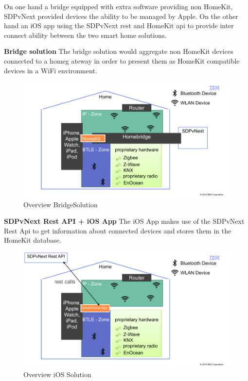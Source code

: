 			On one hand a bridge equipped with extra software providing non HomeKit, SDPvNext provided devices the ability to be managed by Apple. On the other hand an iOS app using the SDPvNext rest and HomeKit api to provide inter connect ability between the two smart home solutions.

			\pagebreak

			\textbf{Bridge solution}
				The bridge solution would aggregate non HomeKit devices connected to a homeg ateway in order to present them as HomeKit compatible devices in a WiFi environment.

				\begin{figure}[h]
					\centering
						\includegraphics[width=.9\textwidth]{images/praxis/BridgeSolution.jpg}
					\caption{Overview BridgeSolution}
					\label{fig:SmartHomeLandscape}
				\end{figure} 	

			\textbf{SDPvNext Rest API + iOS App}
				The iOS App makes use of the SDPvNext Rest Api to get information about connected devices and stores them in the HomeKit database.

				\begin{figure}[h]
					\centering
						\includegraphics[width=.9\textwidth]{images/praxis/iOSSolution.jpg}
					\caption{Overview iOS Solution}
					\label{fig:SmartHomeLandscape}
				\end{figure} 	

